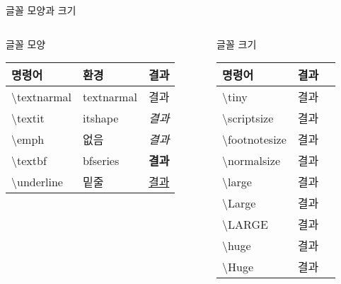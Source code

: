 \documentclass[ aspectratio=149,  14pt,blue,xcolor=pdftex,dvipsnames,table,handout,notes]{beamer}
\begin{document}
		\begin{frame}[t]{글꼴 모양과 크기}

			\begin{columns}[t]
			\begin{column}{.5\textwidth}
					\begin{block}{글꼴 모양}
					\begin{table}
					\begin{tabular}{ l l l  }
					명령어	&환경	&결과\\
					\hline
					\textbackslash textnarmal 	&textnarmal 	&\textnormal{결과}\\
					\textbackslash textit 		&itshape		&\textit{결과}\\
					\textbackslash emph 		&없음		&\emph{결과}\\
					\textbackslash textbf 		&bfseries		&\textbf{결과}\\
					\textbackslash underline 	&밑줄		&\underline{결과}\\
					\end{tabular}
					\end{table}
					\end{block}
			\end{column}
			\begin{column}{.5\textwidth}
					\begin{block}{글꼴 크기}
					\begin{tabular}{ l l l  }
					명령어		&결과\\
					\hline
					\textbackslash tiny			&\tiny{결과}\\
					\textbackslash scriptsize		&\scriptsize{결과}\\
					\textbackslash footnotesize		&\footnotesize{결과}\\
					\textbackslash normalsize		&\normalsize{결과}\\
					\textbackslash large			&\large{결과}\\
					\textbackslash Large			&\Large{결과}\\
					\textbackslash LARGE			&\LARGE{결과}\\
					\textbackslash huge			&\huge{결과}\\
					\textbackslash Huge			&\Huge{결과}\\
					\end{tabular}
					\end{block}
			\end{column}
			\end{columns}


		\end{frame}
\end{document}
